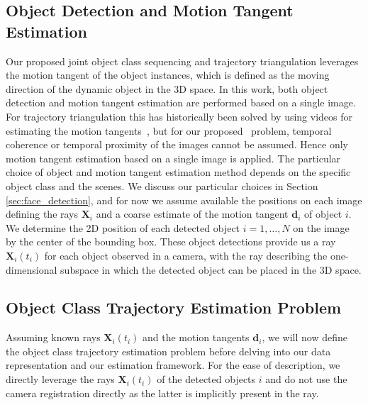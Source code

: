 \subsection{Object Detection and Motion Tangent Estimation}
\label{sec:detection}
Our proposed joint object class sequencing and trajectory triangulation leverages the motion tangent of the object instances, which is defined as the moving direction of the dynamic object in the 3D space. In this work, both object detection and motion tangent estimation are performed based on a single image.
For trajectory triangulation this has historically been solved by using videos for estimating the motion tangents~\cite{zhao2003face}, but for our proposed \jost~problem, temporal coherence or temporal proximity of the images cannot be assumed. Hence only motion tangent estimation based on a single image is applied.
The particular choice of object and motion tangent estimation method depends on the specific object class and the scenes.
We discuss our particular choices in Section \ref{sec:face_detection}, and for now we assume available the positions on each image defining the rays $\mathbf{X}_i$ and a coarse estimate of the motion tangent $\mathbf{d}_i$ of object $i$.
We determine the 2D position of each detected object $i=1,\dots, N$ on the image by the center of the bounding box.
These object detections provide us a ray $\mathbf{X}_i(t_i)$ for each object observed in a camera, with the ray describing the one-dimensional subspace in which the detected object can be placed in the 3D space.


\subsection{Object Class Trajectory Estimation Problem}
\label{sec:problem}
Assuming known rays $\mathbf{X}_i(t_i)$ and the motion tangents $\mathbf{d}_{i}$, we will now define the object class trajectory estimation problem before delving into our data representation and our estimation framework. For the ease of description, we directly leverage the rays $\mathbf{X}_i(t_i)$ of the detected objects $i$ and do not use the camera registration directly as the latter is implicitly present in the ray.

